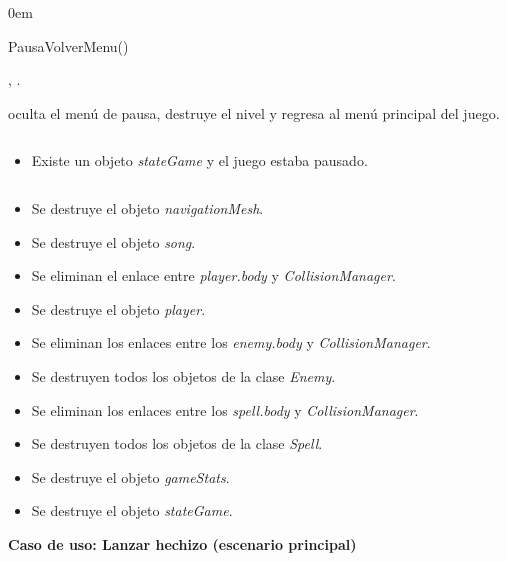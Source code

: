 \begin{description}
    \itemsep0em
    \item [Operación] PausaVolverMenu()
    \item [Actores] \jugador, \sistema.
    \item [Responsabilidades] oculta el menú de pausa, destruye el nivel y
    regresa al menú principal del juego.
    \item [Precondiciones]$\quad$
        \begin{itemize}
            \itemsep0em
            \item Existe un objeto \textit{stateGame} y el juego estaba pausado.
        \end{itemize}
    \item [Postcondiciones]$\quad$
        \begin{itemize}
            \itemsep0em
            \item Se destruye el objeto \textit{navigationMesh}.
            \item Se destruye el objeto \textit{song}.
            \item Se eliminan el enlace entre \textit{player.body} y \textit{CollisionManager}.
            \item Se destruye el objeto \textit{player}.
            \item Se eliminan los enlaces entre los \textit{enemy.body}
            y \textit{CollisionManager}.
            \item Se destruyen todos los objetos de la clase \textit{Enemy}.
            \item Se eliminan los enlaces entre los \textit{spell.body} y
            \textit{CollisionManager}.
            \item Se destruyen todos los objetos de la clase \textit{Spell}.
            \item Se destruye el objeto \textit{gameStats}.
            \item Se destruye el objeto \textit{stateGame}.\\
        \end{itemize}
\end{description}


\textbf{Caso de uso: Lanzar hechizo (escenario principal)}


